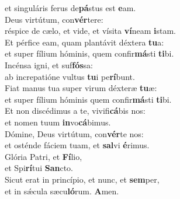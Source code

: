 \evenverse et singuláris ferus de\textbf{pá}stus est \textbf{e}am.\\
\oddverse Deus virtútum, con\textbf{vér}tere:~\*\\
\oddverse réspice de cælo, et vide, et vísita \textbf{ví}neam \textbf{i}stam.\\
\evenverse Et pérfice eam, quam plantávit déxtera \textbf{tu}a:~\*\\
\evenverse et super fílium hóminis, quem confir\textbf{má}sti \textbf{ti}bi.\\
\oddverse Incénsa igni, et suf\textbf{fós}sa:~\*\\
\oddverse ab increpatióne vultus \textbf{tu}i pe\textbf{rí}bunt.\\
\evenverse Fiat manus tua super virum déxteræ \textbf{tu}æ:~\*\\
\evenverse et super fílium hóminis quem confir\textbf{má}sti \textbf{ti}bi.\\
\oddverse Et non discédimus a te, vivifi\textbf{cá}bis nos:~\*\\
\oddverse et nomen tuum \textbf{in}vo\textbf{cá}bimus.\\
\evenverse Dómine, Deus virtútum, con\textbf{vér}te nos:~\*\\
\evenverse et osténde fáciem tuam, et \textbf{sal}vi \textbf{é}rimus.\\
\oddverse Glória Patri, et \textbf{Fí}lio,~\*\\
\oddverse et Spi\textbf{rí}tui \textbf{San}cto.\\
\evenverse Sicut erat in princípio, et nunc, et \textbf{sem}per,~\*\\
\evenverse et in sǽcula sæcu\textbf{ló}rum. \textbf{A}men.\\

